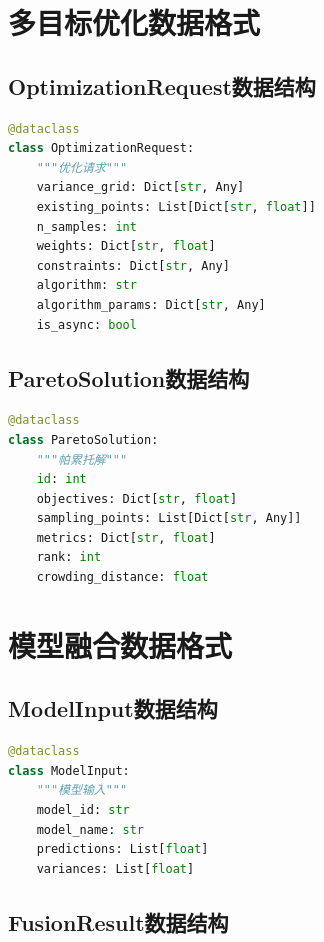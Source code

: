 \documentclass[12pt,a4paper,openany]{report}
\begin{document}
\section{多目标优化数据格式}

\subsection{OptimizationRequest数据结构}

\begin{lstlisting}[language=Python, caption=OptimizationRequest数据结构]
@dataclass
class OptimizationRequest:
    """优化请求"""
    variance_grid: Dict[str, Any]
    existing_points: List[Dict[str, float]]
    n_samples: int
    weights: Dict[str, float]
    constraints: Dict[str, Any]
    algorithm: str
    algorithm_params: Dict[str, Any]
    is_async: bool
\end{lstlisting}

\subsection{ParetoSolution数据结构}

\begin{lstlisting}[language=Python, caption=ParetoSolution数据结构]
@dataclass
class ParetoSolution:
    """帕累托解"""
    id: int
    objectives: Dict[str, float]
    sampling_points: List[Dict[str, Any]]
    metrics: Dict[str, float]
    rank: int
    crowding_distance: float
\end{lstlisting}

\section{模型融合数据格式}

\subsection{ModelInput数据结构}

\begin{lstlisting}[language=Python, caption=ModelInput数据结构]
@dataclass
class ModelInput:
    """模型输入"""
    model_id: str
    model_name: str
    predictions: List[float]
    variances: List[float]
\end{lstlisting}

\subsection{FusionResult数据结构}
\end{document}
